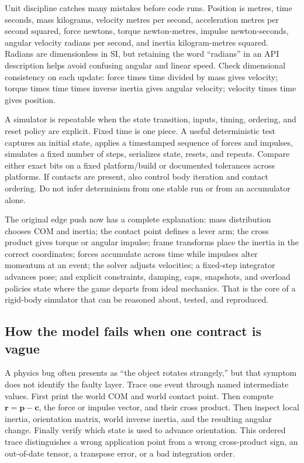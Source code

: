 Unit discipline catches many mistakes before code runs. Position is metres, time seconds, mass kilograms, velocity metres per second, acceleration metres per second squared, force newtons, torque newton-metres, impulse newton-seconds, angular velocity radians per second, and inertia kilogram-metres squared. Radians are dimensionless in SI, but retaining the word ``radians'' in an API description helps avoid confusing angular and linear speed. Check dimensional consistency on each update: force times time divided by mass gives velocity; torque times time times inverse inertia gives angular velocity; velocity times time gives position.

A simulator is repeatable when the state transition, inputs, timing, ordering, and reset policy are explicit. Fixed time is one piece. A useful deterministic test captures an initial state, applies a timestamped sequence of forces and impulses, simulates a fixed number of steps, serializes state, resets, and repeats. Compare either exact bits on a fixed platform/build or documented tolerances across platforms. If contacts are present, also control body iteration and contact ordering. Do not infer determinism from one stable run or from an accumulator alone.

The original edge push now has a complete explanation: mass distribution chooses COM and inertia; the contact point defines a lever arm; the cross product gives torque or angular impulse; frame transforms place the inertia in the correct coordinates; forces accumulate across time while impulses alter momentum at an event; the solver adjusts velocities; a fixed-step integrator advances pose; and explicit constraints, damping, caps, snapshots, and overload policies state where the game departs from ideal mechanics. That is the core of a rigid-body simulator that can be reasoned about, tested, and reproduced.

\subsection{How the model fails when one contract is vague}\label{06-engine-ii-ch034-how-the-model-fails-when-one-contract-is-vague}

\hypertarget{06-engine-ii-ch034-how-the-model-fails-when-one-contract-is-vague}{}

A physics bug often presents as ``the object rotates strangely,'' but that symptom does not identify the faulty layer. Trace one event through named intermediate values. First print the world COM and world contact point. Then compute \(\mathbf r=\mathbf p-\mathbf c\), the force or impulse vector, and their cross product. Then inspect local inertia, orientation matrix, world inverse inertia, and the resulting angular change. Finally verify which state is used to advance orientation. This ordered trace distinguishes a wrong application point from a wrong cross-product sign, an out-of-date tensor, a transpose error, or a bad integration order.

